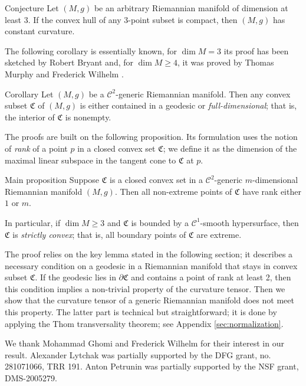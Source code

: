 \documentclass[a4paper,10pt]{article}
\begin{document}
\begin{thm}{Conjecture}  Let $(M,g)$ be an arbitrary Riemannian manifold of dimension at least 3.
If the convex hull of any 3-point subset is compact,
then $(M,g)$ has constant curvature.
\end{thm}

The following corollary is essentially known, for $\dim M=3$ its proof has been sketched by Robert Bryant \cite{Bryant} and, for $\dim M\geq 4$, it was proved by Thomas Murphy and Frederick Wilhelm \cite{Wilhelm}.

\begin{thm}{Corollary}\label{cor:main}
Let $(M,g)$ be a $\mathcal C^2$-generic Riemannian manifold.
Then any convex subset $\mathfrak C$ of $(M,g)$ is either contained in a geodesic
or \emph{full-dimensional}; that is, the interior of $\mathfrak C$ is nonempty.
\end{thm}

The proofs are built on the following proposition.
Its formulation uses the notion of \emph{rank} of a point $p$ in a closed convex set $\mathfrak{C}$;
we define it as the dimension of the maximal linear subspace in the tangent cone to $\mathfrak{C}$ at $p$.

\begin{thm}{Main proposition}\label{prom:rank}
Suppose $\mathfrak{C}$ is a closed convex set in a $\mathcal C^2$-generic $m$-dimensional Riemannian manifold $(M,g)$.
Then all non-extreme points of $\mathfrak{C}$ have rank either $1$ or $m$.

In particular, if $\dim M\ge 3$ and $\mathfrak{C}$ is bounded by a $\mathcal{C}^1$-smooth hypersurface, then $\mathfrak{C}$ is \emph{strictly convex};
that is, all boundary points of $\mathfrak{C}$ are extreme.
\end{thm}


The proof relies on the key lemma stated in the following section;   
it describes a necessary condition on a geodesic in a Riemannian manifold that stays
in convex subset $\mathfrak C$.
If the geodesic  lies in $\partial \mathfrak C$ and  contains a point of rank at least 2, then this condition implies a non-trivial
property  of the curvature tensor.
Then we show that the curvature tensor of a generic Riemannian manifold does not meet this property.
The latter part is technical but straightforward; it is done by applying the Thom transversality theorem; see Appendix \ref{sec:normalization}.


We thank Mohammad Ghomi and Frederick Wilhelm for their interest in our result.
Alexander Lytchak was partially supported by the DFG grant, no. 281071066, TRR 191.
Anton Petrunin was partially supported by the NSF grant, DMS-2005279.
\end{document}
